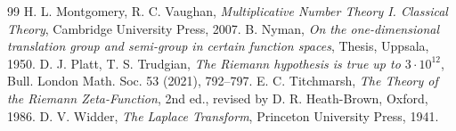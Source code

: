 \documentclass[11pt]{amsart}
\theoremstyle{remark}
\theoremstyle{definition}
\begin{document}
\begin{thebibliography}{99}
 H. L. Montgomery, R. C. Vaughan, \emph{Multiplicative Number Theory I. Classical Theory}, Cambridge University Press, 2007.
 B. Nyman, \emph{On the one-dimensional translation group and semi-group in certain function spaces}, Thesis, Uppsala, 1950.
 D. J. Platt, T. S. Trudgian, \emph{The Riemann hypothesis is true up to $3\cdot10^{12}$}, Bull. London Math. Soc. 53 (2021), 792--797.
 E. C. Titchmarsh, \emph{The Theory of the Riemann Zeta-Function}, 2nd ed., revised by D. R. Heath-Brown, Oxford, 1986.
 D. V. Widder, \emph{The Laplace Transform}, Princeton University Press, 1941.
\end{thebibliography}
\end{document}
